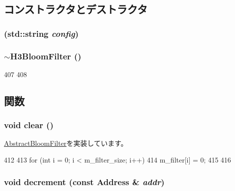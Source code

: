 \subsection{コンストラクタとデストラクタ}
\hypertarget{classH3BloomFilter_a473a691277c02ebbcd37483cc5bdc324}{
\subsubsection[{H3BloomFilter}]{ (std::string {\em config})}}
\label{classH3BloomFilter_a473a691277c02ebbcd37483cc5bdc324}
\hypertarget{classH3BloomFilter_a4267fd045f1a2b59d8f82a39c703de7c}{
\subsubsection[{$\sim$H3BloomFilter}]{\setlength{\rightskip}{0pt plus 5cm}$\sim${\bf H3BloomFilter} ()}}
\label{classH3BloomFilter_a4267fd045f1a2b59d8f82a39c703de7c}



\begin{DoxyCode}
407 {
408 }
\end{DoxyCode}


\subsection{関数}
\hypertarget{classH3BloomFilter_ac8bb3912a3ce86b15842e79d0b421204}{
\subsubsection[{clear}]{\setlength{\rightskip}{0pt plus 5cm}void clear ()}}
\label{classH3BloomFilter_ac8bb3912a3ce86b15842e79d0b421204}


\hyperlink{classAbstractBloomFilter_a5eeb94d22b8366d1b68d0614384802fe}{AbstractBloomFilter}を実装しています。


\begin{DoxyCode}
412 {
413     for (int i = 0; i < m_filter_size; i++) {
414         m_filter[i] = 0;
415     }
416 }
\end{DoxyCode}
\hypertarget{classH3BloomFilter_addb6b805abb8328082a24926f2bf8c84}{
\subsubsection[{decrement}]{\setlength{\rightskip}{0pt plus 5cm}void decrement (const {\bf Address} \& {\em addr})}}
\label{classH3BloomFilter_addb6b805abb8328082a24926f2bf8c84}


